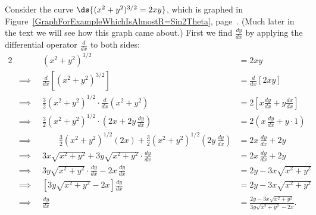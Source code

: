 \bex Consider the curve $\ds{(x^2+y^2)^{3/2}=2xy}$, which is graphed
in Figure~\ref{GraphForExampleWhichIsAlmostR=Sin2Theta},
page~\pageref{GraphForExampleWhichIsAlmostR=Sin2Theta}.  (Much later
in the text we will see how this graph came about.)
First we find $\frac{dy}{dx}$ by applying the differential
operator $\frac{d}{dx}$ to both sides:
\begin{alignat*}{2}
&\qquad&(x^2+y^2)^{3/2}&=2xy\\
&\implies&\frac{d}{dx}\left[(x^2+y^2)^{3/2}\right]&
                   =\frac{d}{dx}\left[2xy\right]\\
&\implies&\frac32(x^2+y^2)^{1/2}\cdot\frac{d}{dx}(x^2+y^2)&=
    2\left[x\frac{dy}{dx}+y\frac{dx}{dx}\right]\\
&\implies&\frac32(x^2+y^2)^{1/2}\cdot\left(2x+2y\,\frac{dy}{dx}\right)
                  &=2\left(x\,\frac{dy}{dx}+y\cdot1\right)\\
&\implies&\qquad\frac32(x^2+y^2)^{1/2}(2x)+\frac32(x^2+y^2)^{1/2}
                                          \left(2y\,\frac{dy}{dx}\right)
                  &=2x\,\frac{dy}{dx}+2y\\
&\implies &3x\sqrt{x^2+y^2}+3y\sqrt{x^2+y^2}\cdot\frac{dy}{dx}&
          =2x\,\frac{dy}{dx}+2y\\
&\implies&3y\sqrt{x^2+y^2}\cdot\frac{dy}{dx}-2x\,\frac{dy}{dx}&
           =2y-3x\sqrt{x^2+y^2}\\
&\implies&\left[3y\sqrt{x^2+y^2}-2x\right]\frac{dy}{dx}&=2y-3x\sqrt{x^2+y^2}\\
&\implies&\frac{dy}{dx}&=\frac{2y-3x\sqrt{x^2+y^2}}{3y\sqrt{x^2+y^2}-2x}.
\end{alignat*}

